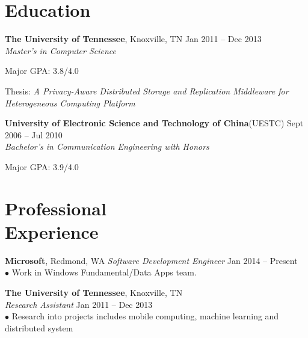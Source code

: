 \documentclass[margin, centered]{resume}
\begin{document}
\address{\\
\textbf{Email}: jilong.liao@outlook.com \hspace{50mm}\hfill \textbf{Address}: 16340 NE 83rd St.\\
\textbf{Phone}: 865-360-6082 \hfill Apt D-221\\
\textbf{Home Page}: http://jilongliao.com \hfill Redmond WA, 98052
}
\begin{resume}

    \section{\mysidestyle Education}

    \textbf{The University of Tennessee}, Knoxville, TN \hfill Jan 2011 -- Dec 2013\\
    \emph{Master's in Computer Science}
    \begin{list2}
        \item Major GPA: 3.8/4.0
        \item Thesis: \emph{A Privacy-Aware Distributed Storage and Replication Middleware for Heterogeneous Computing Platform}
    \end{list2}
    \textbf{University of Electronic Science and Technology of China}(UESTC) \hfill Sept 2006 -- Jul 2010\\
	\emph{Bachelor's in Communication Engineering with Honors}
	\begin{list2}
		\item Major GPA: 3.9/4.0
	\end{list2}\vspace{-1mm}

    \section{\mysidestyle Professional\\Experience}

    \textbf{Microsoft}, Redmond, WA
    \emph{Software Development Engineer} \hfill Jan 2014 -- Present \\
    $\bullet$ Work in Windows Fundamental/Data Apps team. 

    \textbf{The University of Tennessee}, Knoxville, TN \\
    \emph{Research Assistant} \hfill Jan 2011 -- Dec 2013\\
    $\bullet$ Research into projects includes mobile computing, machine learning and distributed system


\end{resume}
\end{document}
